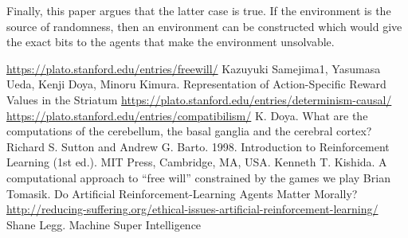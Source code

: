 \documentclass[a4paper]{article}
\begin{document}
Finally, this paper argues that the latter case is true. If the environment is the source of randomness, then an environment can be constructed which would give the exact bits to the agents that make the environment unsolvable.

\begin{thebibliography}{20}
 \url{https://plato.stanford.edu/entries/freewill/}
 Kazuyuki Samejima1, Yasumasa Ueda, Kenji Doya, Minoru Kimura. Representation of Action-Specific Reward Values in the Striatum
 \url{https://plato.stanford.edu/entries/determinism-causal/}
 \url{https://plato.stanford.edu/entries/compatibilism/}
 K. Doya. What are the computations of the cerebellum, the basal ganglia and the cerebral cortex?
 Richard S. Sutton and Andrew G. Barto. 1998. Introduction to Reinforcement Learning (1st ed.). MIT Press, Cambridge, MA, USA.
 Kenneth T. Kishida. A computational approach to “free will” constrained by the games we play
 Brian Tomasik. Do Artificial Reinforcement-Learning Agents Matter Morally?
 \url{http://reducing-suffering.org/ethical-issues-artificial-reinforcement-learning/}
 Shane Legg. Machine Super Intelligence

\end{thebibliography}
\end{document}
